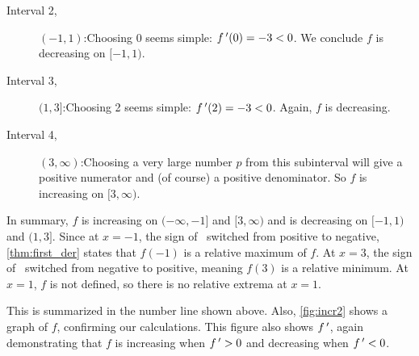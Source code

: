 \begin{example}
\begin{description}
\item[Interval 2,] $(-1,1)$:\quad Choosing 0 seems simple: $f\,'(0)=-3<0$. We conclude $f$ is decreasing on $[-1,1)$.

\item[Interval 3,] $(1,3]$:\quad Choosing 2 seems simple: $f\,'(2) = -3<0$. Again, $f$ is decreasing.

\item[Interval 4,] $(3,\infty)$:\quad Choosing a very large number $p$ from this subinterval will give a positive numerator and (of course) a positive denominator. So $f$ is increasing on $[3,\infty)$.
\end{description}

In summary, $f$ is increasing on $(-\infty,-1]$ and $[3,\infty)$ and is decreasing on $[-1,1)$ and $(1,3]$. Since at $x=-1$, the sign of \fp\ switched from positive to negative, \autoref{thm:first_der} states that $f(-1)$ is a relative maximum of $f$. At $x=3$, the sign of \fp\ switched from negative to positive, meaning $f(3)$ is a relative minimum. At $x=1$, $f$ is not defined, so there is no relative extrema at $x=1$.


\begin{center}
\end{center}


This is summarized in the number line shown above. Also, \autoref{fig:incr2} shows a graph of $f$, confirming our calculations. This figure also shows $f\,'$, again demonstrating that $f$ is increasing when $f\,'>0$ and decreasing when $f\,'<0$.
\end{example}

